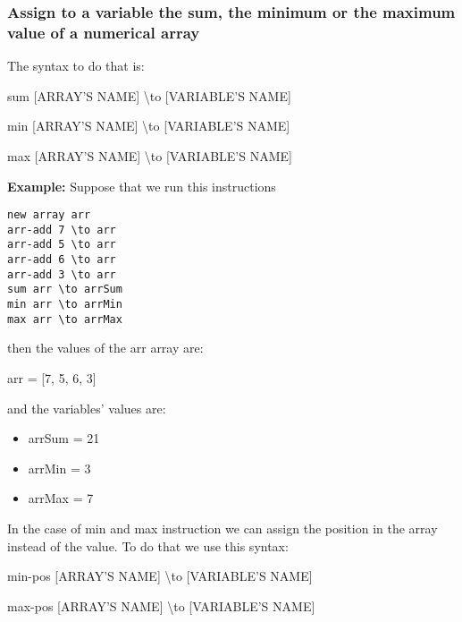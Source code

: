 \documentclass[11pt,a4paper,openright,oneside]{book}
\newenvironment{ex}
{
  \setlength{\parindent}{0cm}
  \large \textbf{Example:} \normalsize 
}
{}
\begin{document}
\subsubsection{Assign to a variable the sum, the minimum or the maximum value of a numerical array}
The syntax to do that is:
\begin{center} \textsf{sum \textsc{\scriptsize[ARRAY'S NAME]} \textbackslash to \textsc{\scriptsize[VARIABLE'S NAME]}} \normalsize \end{center}
\begin{center} \textsf{min \textsc{\scriptsize[ARRAY'S NAME]} \textbackslash to \textsc{\scriptsize[VARIABLE'S NAME]}} \normalsize \end{center}
\begin{center} \textsf{max \textsc{\scriptsize[ARRAY'S NAME]} \textbackslash to \textsc{\scriptsize[VARIABLE'S NAME]}} \normalsize \end{center}

\begin{ex} Suppose that we run this instructions
  \begin{lstlisting}
new array arr
arr-add 7 \to arr
arr-add 5 \to arr
arr-add 6 \to arr
arr-add 3 \to arr
sum arr \to arrSum
min arr \to arrMin
max arr \to arrMax
  \end{lstlisting}
  then the values of the \textsf{arr} array are:
  \begin{center} \textsf{arr = [7, 5, 6, 3]}\end{center}
  and the variables' values are:
  \begin{itemize}
    \item \textsf{arrSum = 21}
    \item \textsf{arrMin = 3}
    \item \textsf{arrMax = 7}
  \end{itemize}
\end{ex}

In the case of \textsf{min} and \textsf{max} instruction we can assign the position in the array instead of the value. To do that we use this syntax:
\begin{center} \textsf{min-pos \textsc{\scriptsize[ARRAY'S NAME]} \textbackslash to \textsc{\scriptsize[VARIABLE'S NAME]}} \normalsize \end{center}
\begin{center} \textsf{max-pos \textsc{\scriptsize[ARRAY'S NAME]} \textbackslash to \textsc{\scriptsize[VARIABLE'S NAME]}} \normalsize \end{center}
\end{document}
